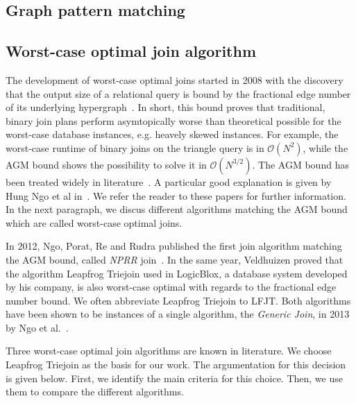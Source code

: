 \subsection{Graph pattern matching}
%

\subsection{Worst-case optimal join algorithm}\label{subsec:worst-case-optimal-join-algorithm}
The development of worst-case optimal joins started in 2008 with the discovery that the output size of a relational query
is bound by the fractional edge number of its underlying hypergraph~\cite{agm}.
In short, this bound proves that traditional, binary join plans perform asymtopically worse than theoretical possible
for the worst-case database instances, e.g. heavely skewed instances.
For example, the worst-case runtime of binary joins on the triangle query is in $\mathcal{O} (N^2)$, while the AGM bound
shows the possibility to solve it in $\mathcal{O} (N^{3/2})$.
The AGM bound has been treated widely in literature~\cite{skew-strikes-back,andreas,agm}.
A particular good explanation is given by Hung Ngo et al in~\cite{skew-strikes-back}.
We refer the reader to these papers for further information.
In the next paragraph, we discus different algorithms matching the AGM bound which are called worst-case optimal joins.

In 2012, Ngo, Porat, Re and Rudra published the first join algorithm matching the AGM bound, called \textit{NPRR} join~\cite{nprr}.
In the same year, Veldhuizen proved that the algorithm Leapfrog Triejoin used in LogicBlox,
a database system developed by his company, is also worst-case optimal with regards to the fractional edge number bound.
We often abbreviate Leapfrog Triejoin to \textsc{LFJT}.
Both algorithms have been shown to be instances of a single algorithm, the \textit{Generic Join}, in 2013 by Ngo et al.~\cite{skew-strikes-back}.

Three worst-case optimal join algorithms are known in literature.
We choose Leapfrog Triejoin as the basis for our work.
The argumentation for this decision is given below.
First, we identify the main criteria for this choice.
Then, we use them to compare the different algorithms.

